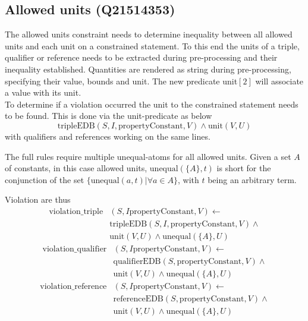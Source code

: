 \documentclass[hyperref,bachelorofscience,fleqn]{cgvpub}
\begin{document}
\subsection{Allowed units (Q21514353)}\label{subsec_3_allowed_units}
The allowed units constraint needs to determine inequality between all allowed units and each unit on a constrained statement. To this end the units of a triple, qualifier or reference needs to be extracted during pre-processing and their inequality established. Quantities are rendered as string during pre-processing, specifying their value, bounds and unit. The new predicate unit\([2]\) will associate a value with its unit.\\

To determine if a violation occurred the unit to the constrained statement needs to be found. This is done via the unit-predicate as below
\begin{equation*}
\text{tripleEDB}(S, I, \text{propertyConstant}, V) \wedge \text{unit}(V, U)
\end{equation*}
with qualifiers and references working on the same lines.

The full rules require multiple unequal-atoms for all allowed units. Given a set \(A\) of constants, in this case allowed units, \(\text{unequal}(\{A\}, t)\) is short for the conjunction of the set \(\{\text{unequal}(a, t) | \forall a \in A\}\), with \(t\) being an arbitrary term.

Violation are thus
\begin{equation*}
\begin{split}
\text{violation\_triple}&(S, I \text{propertyConstant}, V) \leftarrow \\
&\text{tripleEDB}(S, I, \text{propertyConstant}, V) \wedge \\
&\text{unit}(V, U) \wedge \text{unequal}(\{A\}, U)
\end{split}
\end{equation*}
\begin{equation*}
\begin{split}
\text{violation\_qualifier}&(S, I \text{propertyConstant}, V) \leftarrow \\
&\text{qualifierEDB}(S, \text{propertyConstant}, V) \wedge \\
&\text{unit}(V, U) \wedge \text{unequal}(\{A\}, U)
\end{split}
\end{equation*}
\begin{equation*}
\begin{split}
\text{violation\_reference}&(S, I \text{propertyConstant}, V) \leftarrow \\
&\text{referenceEDB}(S, \text{propertyConstant}, V) \wedge \\
&\text{unit}(V, U) \wedge \text{unequal}(\{A\}, U)
\end{split}
\end{equation*}
\end{document}
